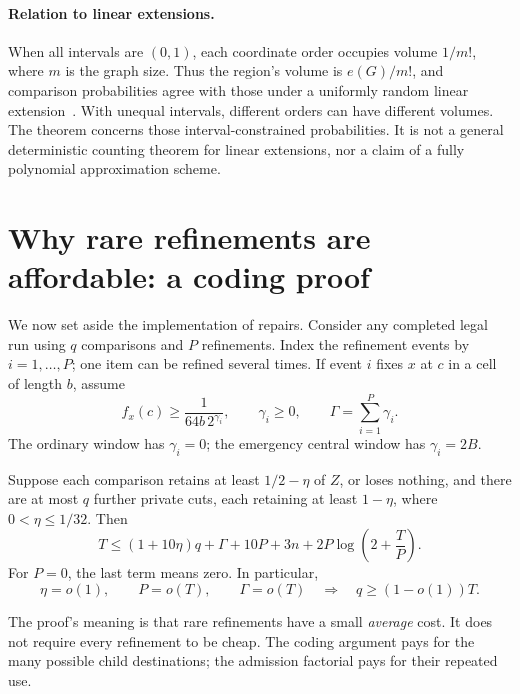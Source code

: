 \paragraph{Relation to linear extensions.}
When all intervals are \((0,1)\), each coordinate order occupies volume \(1/m!\), where \(m\) is the graph size. Thus the region's volume is \(e(G)/m!\), and comparison probabilities agree with those under a uniformly random linear extension~\cite{stanley}. With unequal intervals, different orders can have different volumes. The theorem concerns those interval-constrained probabilities. It is not a general deterministic counting theorem for linear extensions, nor a claim of a fully polynomial approximation scheme.

\section{Why rare refinements are affordable: a coding proof}\label{sec:accounting}

We now set aside the implementation of repairs. Consider any completed legal run using \(q\) comparisons and \(P\) refinements. Index the refinement events by \(i=1,\ldots,P\); one item can be refined several times. If event \(i\) fixes \(x\) at \(c\) in a cell of length \(b\), assume
\begin{equation}\label{eq:tariff}
f_x(c)\ge\frac1{64b\,2^{\gamma_i}},
\qquad \gamma_i\ge0,
\qquad \Gamma=\sum_{i=1}^P\gamma_i.
\end{equation}
The ordinary window has \(\gamma_i=0\); the emergency central window has \(\gamma_i=2B\).

\begin{theorem}\label{thm:rare}
Suppose each comparison retains at least \(1/2-\eta\) of \(Z\), or loses nothing, and there are at most \(q\) further private cuts, each retaining at least \(1-\eta\), where \(0<\eta\le1/32\). Then
\begin{equation}\label{eq:master}
\boxed{
T\le(1+10\eta)q+\Gamma+10P+3n+
          2P\log\!\left(2+\frac TP\right).
}
\end{equation}
For \(P=0\), the last term means zero. In particular,
\[
\eta=o(1),\qquad P=o(T),\qquad\Gamma=o(T)
\quad\Longrightarrow\quad q\ge(1-o(1))T.
\]
\end{theorem}

The proof's meaning is that rare refinements have a small \emph{average} cost. It does not require every refinement to be cheap. The coding argument pays for the many possible child destinations; the admission factorial pays for their repeated use.

